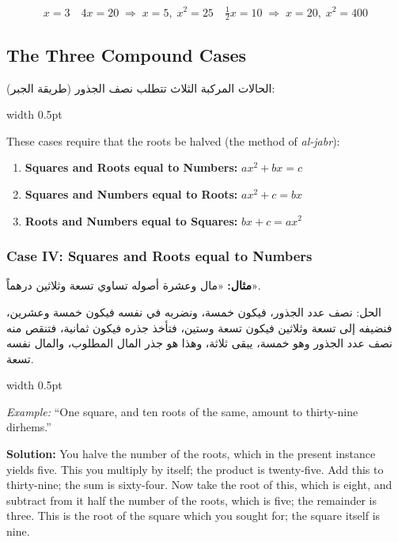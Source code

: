 \documentclass[10pt,a4paper]{book}
\newlength{\colwidth}
\newcommand{\bilingualpair}[2]{%
  \noindent
  \begin{minipage}[t]{\colwidth}
  \begin{flushright}
  \vspace{0pt}
  {\arabicfont\small #1}
  \end{flushright}
  \end{minipage}%
  \hfill\textcolor{columnsepclr}{\vrule width 0.5pt}\hfill
  \begin{minipage}[t]{\colwidth}
  \vspace{0pt}
  {\small #2}
  \end{minipage}%
  \par\vspace{0.6em}
}
\begin{document}
\begin{equation}
\boxed{x = 3}
\quad
\boxed{4x = 20 \;\Rightarrow\; x = 5, \; x^2 = 25}
\quad
\boxed{\tfrac{1}{2}x = 10 \;\Rightarrow\; x = 20, \; x^2 = 400}
\end{equation}

\subsection{The Three Compound Cases}

\bilingualpair{
الحالات المركبة الثلاث تتطلب نصف الجذور (طريقة الجبر):
}{
These cases require that the roots be halved (the method of \textit{al-jabr}):
}

\vspace{0.5em}
\begin{mathbox}[title={\textbf{Compound Cases (require halving the roots)}}]
\begin{enumerate}[label=\textbf{Case \Roman*:},leftmargin=3em]
  \item[(IV)] \textbf{Squares and Roots equal to Numbers:}
  $ax^2 + bx = c$
  
  \item[(V)] \textbf{Squares and Numbers equal to Roots:}
  $ax^2 + c = bx$
  
  \item[(VI)] \textbf{Roots and Numbers equal to Squares:}
  $bx + c = ax^2$
\end{enumerate}
\end{mathbox}
\vspace{0.5em}


\subsubsection*{Case IV: Squares and Roots equal to Numbers}

\bilingualpair{
\textbf{مثال:} «مال وعشرة أصوله تساوي تسعة وثلاثين درهماً».

الحل: نصف عدد الجذور، فيكون خمسة، ونضربه في نفسه فيكون
خمسة وعشرين، فنضيفه إلى تسعة وثلاثين فيكون تسعة وستين،
فتأخذ جذره فيكون ثمانية، فتنقص منه نصف عدد الجذور وهو خمسة،
يبقى ثلاثة، وهذا هو جذر المال المطلوب، والمال نفسه تسعة.
}{
\textit{Example:} ``One square, and ten roots of the same, amount to
thirty-nine dirhems.''

\textbf{Solution:} You halve the number of the roots, which in the present
instance yields five. This you multiply by itself; the product is twenty-five.
Add this to thirty-nine; the sum is sixty-four. Now take the root of this,
which is eight, and subtract from it half the number of the roots, which is
five; the remainder is three. This is the root of the square which you sought
for; the square itself is nine.
}
\end{document}
